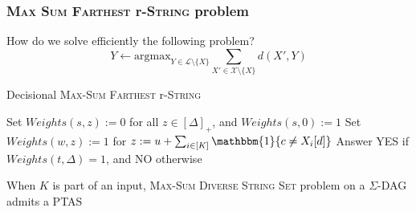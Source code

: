 \documentclass{beamer}
\begin{document}
\begin{frame}
    \frametitle{\textsc{Max Sum Farthest} r-\textsc{String} problem}
    How do we solve efficiently the following problem?
    \[
        Y \gets \text{argmax}_{Y \in \mathcal{L} \setminus \{X\}} \sum_{X' \in \mathcal{X} \setminus \{X\}} d(X', Y)
    \]
    \begin{algorithm}[H] \label{alg:ExactMaxSumFarthest}
        \small{\caption{Decisional \textsc{Max-Sum Farthest} r-\textsc{String}}}
        \footnotesize{\begin{algorithmic}[1]
                \State Set $Weights(s, z) := 0$ for all $z \in [\Delta]_+$, and $Weights(s, 0) := 1$\;
                \State Set $Weights(w, z) := 1$ for $z := u + \sum_{i \in [K]} \mathbbm{1}\{ c \not= X_i[d] \}$ 
                \EndFor
                \EndFor
                \State Answer YES if $Weights(t, \Delta) = 1$, and NO otherwise 
            \end{algorithmic}}
    \end{algorithm}
    \begin{theorem}
        When $K$ is part of an input, \textsc{Max-Sum Diverse String Set} problem on a $\Sigma$-DAG admits a PTAS
    \end{theorem}
\end{frame}



\end{document}

